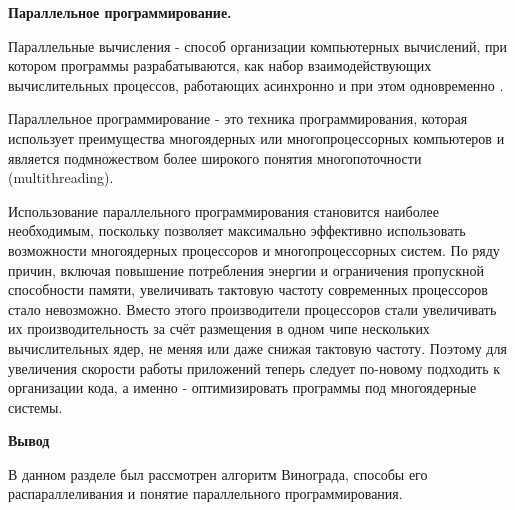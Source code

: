 \par\textbf{Параллельное программирование.}
\par Параллельные вычисления - способ организации компьютерных вычислений, при котором программы разрабатываются, как набор взаимодействующих вычислительных процессов, работающих асинхронно и при этом одновременно \cite{parallel}.

Параллельное программирование - это техника программирования, которая использует преимущества многоядерных или многопроцессорных компьютеров и является подмножеством более широкого понятия многопоточности (multithreading).

Использование параллельного программирования становится наиболее необходимым, поскольку позволяет максимально эффективно использовать возможности многоядерных процессоров и многопроцессорных систем. По ряду причин, включая повышение потребления энергии и ограничения пропускной способности памяти, увеличивать тактовую частоту современных процессоров стало невозможно. Вместо этого производители процессоров стали увеличивать их производительность за счёт размещения в одном чипе нескольких вычислительных ядер, не меняя или даже снижая тактовую частоту. Поэтому для увеличения скорости работы приложений теперь следует по-новому подходить к организации кода, а именно - оптимизировать программы под многоядерные системы.

\par\textbf{Вывод}
\par В данном разделе был рассмотрен алгоритм Винограда, способы его распараллеливания и понятие параллельного программирования.